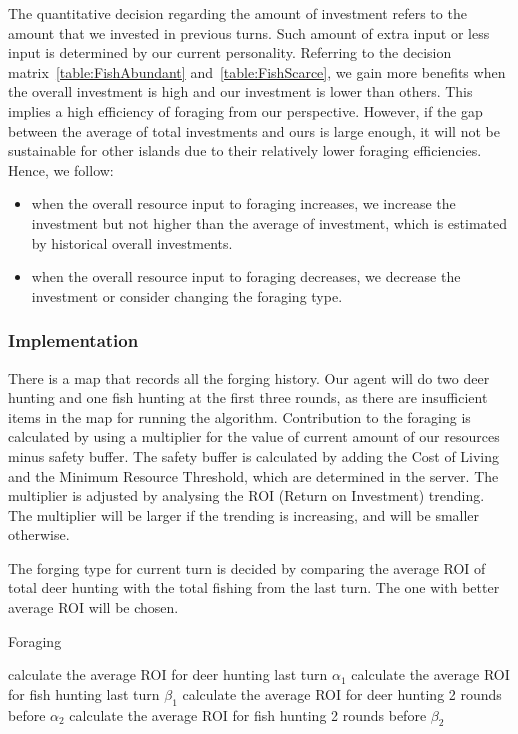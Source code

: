 The quantitative decision regarding the amount of investment refers to the amount that we invested in previous turns. Such amount of extra input or less input is determined by our current personality. Referring to the decision matrix~\ref{table:FishAbundant} and~\ref{table:FishScarce}, we gain more benefits when the overall investment is high and our investment is lower than others. This implies a high efficiency of foraging from our perspective. However, if the gap between the average of total investments and ours is large enough, it will not be sustainable for other islands due to their relatively lower foraging efficiencies. Hence, we follow:
\begin{itemize}
    \item when the overall resource input to foraging increases, we increase the investment but not higher than the average of investment, which is estimated by historical overall investments.
    \item when the overall resource input to foraging decreases, we decrease the investment or consider changing the foraging type.
\end{itemize}


\subsubsection{Implementation} \label{subsubsec:Team6_Foraging:Implementation}
There is a map that records all the forging history. Our agent will do two deer hunting and one fish hunting at the first three rounds, as there are insufficient items in the map for running the algorithm. Contribution to the foraging is calculated by using a multiplier for the value of current amount of our resources minus safety buffer. The safety buffer is calculated by adding the Cost of Living and the Minimum Resource Threshold, which are determined in the server. The multiplier is adjusted by analysing the ROI (Return on Investment) trending. The multiplier will be larger if the trending is increasing, and will be smaller otherwise.

The forging type for current turn is decided by comparing the average ROI of total deer hunting with the total fishing from the last turn. The one with better average ROI will be chosen.

\begin{algorithm}[H]
\caption{Foraging} 
    calculate the average ROI for deer hunting last turn $\alpha_1$\;
    calculate the average ROI for fish hunting last turn  $\beta_1$\;
    calculate the average ROI for deer hunting 2 rounds before $\alpha_2$\;
    calculate the average ROI for fish hunting 2 rounds before $\beta_2$\;
\end{algorithm}

